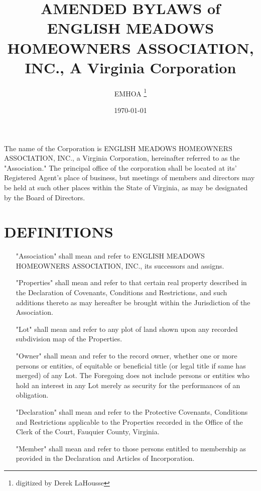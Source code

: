 \documentclass[12pt, letterpaper]{article}
\title{AMENDED BYLAWS of ENGLISH MEADOWS HOMEOWNERS ASSOCIATION, INC., A Virginia Corporation}
\author{EMHOA \thanks{digitized by Derek LaHousse}}
\date{\today}
\begin{document}
\maketitle

\tableofcontents

\section{}
The name of the Corporation is ENGLISH MEADOWS HOMEOWNERS ASSOCIATION, INC., a Virginia Corporation, hereinafter referred to as the "Association."
The principal office of the corporation shall be located at its' Registered Agent's place of business, but meetings of members and directors may be held at such other places within the State of Virginia, as may be designated by the Board of Directors.

\section{DEFINITIONS}
\begin{enumerate}
 \item["Association"] shall mean and refer to ENGLISH MEADOWS HOMEOWNERS ASSOCIATION, INC., its successors and assigns.
 \item["Properties"] shall mean and refer to that certain real property described in the Declaration of Covenants, Conditions and Restrictions, and such additions thereto as may hereafter be brought within the Jurisdiction of the Association.
 \item["Lot"] shall mean and refer to any plot of land shown upon any recorded subdivision map of the Properties.
 \item["Owner"] shall mean and refer to the record owner, whether one or more persons or entities, of equitable or beneficial title (or legal title if same has merged) of any Lot.
  The Foregoing does not include persons or entities who hold an interest in any Lot merely as security for the performances of an obligation.
 \item["Declaration"] shall mean and refer to the Protective Covenants, Conditions and Restrictions applicable to the Properties recorded in the Office of the Clerk of the Court, Fauquier County, Virginia.
 \item["Member"] shall mean and refer to those persons entitled to membership as provided in the Declaration and Articles of Incorporation.
\end{enumerate}
\end{document}
